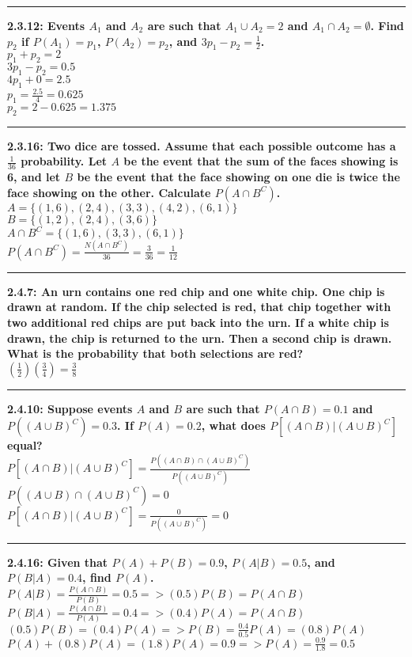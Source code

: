 \documentclass[11pt]{article}
\newcommand\question[2]{\vspace{.25in}\hrule\textbf{#1: #2}}
\begin{document}
\question{2.3.12}{Events $A_1$ and $A_2$ are such that $A_1 \cup A_2 = 2$
and $A_1 \cap A_2 = \emptyset$. Find $p_2$ if $P(A_1)=p_1$, $P(A_2)=p_2$,
and $3p_1 - p_2 = \frac{1}{2}$.}
\\ $p_1 + p_2 = 2$
\\ $3p_1 - p_2 = 0.5$
\\ $4p_1 + 0 = 2.5$
\\ $p_1 = \frac{2.5}{4} = 0.625$
\\ $p_2 = 2 - 0.625 = 1.375$


\question{2.3.16}{Two dice are tossed. Assume that each possible outcome has
a $\frac{1}{36}$ probability. Let $A$ be the event that the sum of the faces
showing is 6, and let $B$ be the event that the face showing on one die is
twice the face showing on the other. Calculate $P(A \cap B^C)$.}
\\ $A = \{(1,6), (2,4), (3,3), (4,2), (6,1)\}$
\\ $B = \{(1,2), (2,4), (3,6)\}$
\\ $A \cap B^C = \{(1,6), (3,3), (6,1)\}$
\\ $P(A \cap B^C) = \frac{N(A \cap B^C)}{36} = \frac{3}{36} = \frac{1}{12}$



\question{2.4.7}{An urn contains one red chip and one white chip.
One chip is drawn at random. If the chip selected is red, that chip together
with two additional red chips are put back into the urn. If a white chip
is drawn, the chip is returned to the urn. Then a second chip is drawn.
What is the probability that both selections are red?}
\\ $(\frac{1}{2})  (\frac{3}{4}) = \frac{3}{8}$


\question{2.4.10}{Suppose events $A$ and $B$ are such that $P(A \cap B) = 0.1$
and $P((A \cup B)^C ) = 0.3$. If $P(A)=0.2$, what does 
$P[(A \cap B)|(A \cup B)^C ]$ equal?}
\\ $P[(A \cap B)|(A \cup B)^C ] = \frac{P((A \cap B) \cap (A \cup B)^C)}{P((A \cup B)^C)}$
\\ $P((A \cup B) \cap (A \cup B)^C) = 0$
\\ $P[(A \cap B)|(A \cup B)^C ] = \frac{0}{P((A \cup B)^C)} = 0$


\question{2.4.16}{Given that $P(A)+P(B)=0.9$, $P(A|B)=0.5$,
and $P(B|A)=0.4$, find $P(A)$.}
\\ $P(A|B) = \frac{P(A \cap B)}{P(B)}=0.5 => (0.5)P(B) = P(A \cap B)$
\\ $P(B|A) = \frac{P(A \cap B)}{P(A)}=0.4 => (0.4)P(A) = P(A \cap B)$
\\ $(0.5)P(B) = (0.4)P(A) => P(B) = \frac{0.4}{0.5}P(A) = (0.8)P(A)$
\\ $P(A) + (0.8)P(A) = (1.8)P(A) = 0.9 => P(A) = \frac{0.9}{1.8} = 0.5$
\end{document}
